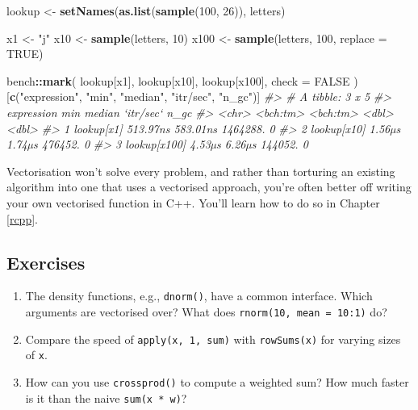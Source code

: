 \documentclass[]{book}
\newenvironment{Shaded}{\begin{snugshade}}{\end{snugshade}}
\newcommand{\CommentTok}[1]{\textcolor[rgb]{0.37,0.37,0.37}{\textit{#1}}}
\newcommand{\DataTypeTok}[1]{\textcolor[rgb]{0.27,0.27,0.27}{#1}}
\newcommand{\DecValTok}[1]{\textcolor[rgb]{0.06,0.06,0.06}{#1}}
\newcommand{\KeywordTok}[1]{\textcolor[rgb]{0.27,0.27,0.27}{\textbf{#1}}}
\newcommand{\NormalTok}[1]{#1}
\newcommand{\OperatorTok}[1]{\textcolor[rgb]{0.43,0.43,0.43}{\textbf{#1}}}
\newcommand{\OtherTok}[1]{\textcolor[rgb]{0.37,0.37,0.37}{#1}}
\newcommand{\StringTok}[1]{\textcolor[rgb]{0.5,0.5,0.5}{#1}}
\begin{document}
\begin{Shaded}
\begin{Highlighting}[]
\NormalTok{lookup <-}\StringTok{ }\KeywordTok{setNames}\NormalTok{(}\KeywordTok{as.list}\NormalTok{(}\KeywordTok{sample}\NormalTok{(}\DecValTok{100}\NormalTok{, }\DecValTok{26}\NormalTok{)), letters)}

\NormalTok{x1 <-}\StringTok{ "j"}
\NormalTok{x10 <-}\StringTok{ }\KeywordTok{sample}\NormalTok{(letters, }\DecValTok{10}\NormalTok{)}
\NormalTok{x100 <-}\StringTok{ }\KeywordTok{sample}\NormalTok{(letters, }\DecValTok{100}\NormalTok{, }\DataTypeTok{replace =} \OtherTok{TRUE}\NormalTok{)}

\NormalTok{bench}\OperatorTok{::}\KeywordTok{mark}\NormalTok{(}
\NormalTok{  lookup[x1],}
\NormalTok{  lookup[x10],}
\NormalTok{  lookup[x100],}
  \DataTypeTok{check =} \OtherTok{FALSE}
\NormalTok{)[}\KeywordTok{c}\NormalTok{(}\StringTok{"expression"}\NormalTok{, }\StringTok{"min"}\NormalTok{, }\StringTok{"median"}\NormalTok{, }\StringTok{"itr/sec"}\NormalTok{, }\StringTok{"n_gc"}\NormalTok{)]}
\CommentTok{#> # A tibble: 3 x 5}
\CommentTok{#>   expression        min   median `itr/sec`  n_gc}
\CommentTok{#>   <chr>        <bch:tm> <bch:tm>     <dbl> <dbl>}
\CommentTok{#> 1 lookup[x1]   513.97ns 583.01ns  1464288.     0}
\CommentTok{#> 2 lookup[x10]    1.56µs   1.74µs   476452.     0}
\CommentTok{#> 3 lookup[x100]   4.53µs   6.26µs   144052.     0}
\end{Highlighting}
\end{Shaded}

Vectorisation won't solve every problem, and rather than torturing an existing algorithm into one that uses a vectorised approach, you're often better off writing your own vectorised function in C++. You'll learn how to do so in Chapter \ref{rcpp}.

\hypertarget{exercises-20}{%
\subsection{Exercises}\label{exercises-20}}

\begin{enumerate}
\def\labelenumi{\arabic{enumi}.}
\item
  The density functions, e.g., \texttt{dnorm()}, have a common interface. Which
  arguments are vectorised over? What does \texttt{rnorm(10,\ mean\ =\ 10:1)} do?
\item
  Compare the speed of \texttt{apply(x,\ 1,\ sum)} with \texttt{rowSums(x)} for varying sizes
  of \texttt{x}.
\item
  How can you use \texttt{crossprod()} to compute a weighted sum? How much faster is
  it than the naive \texttt{sum(x\ *\ w)}?
\end{enumerate}
\end{document}
